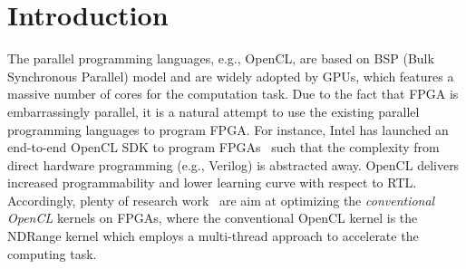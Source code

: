\section{Introduction}

The parallel programming languages, e.g., OpenCL, are based on BSP (Bulk Synchronous Parallel) model and are widely adopted by GPUs, which features a massive number of cores for the computation task. 
Due to the fact that FPGA is embarrassingly parallel, it is a natural attempt to use the existing parallel programming languages to program FPGA. For instance, Intel has launched an end-to-end OpenCL SDK to program FPGAs~\cite{altera_optimization} such that the complexity from direct hardware programming (e.g., Verilog) is abstracted away. OpenCL delivers increased programmability and lower learning curve with respect to RTL. Accordingly, plenty of research work~\cite{flexcl_tc18, opencl_compiler_ERSA12, fpga_opencl_model_hpca16, opencl_hpc_sc16, comba_iccad17, auto_code_generation_dac18} are aim at optimizing the \emph{conventional OpenCL} kernels on FPGAs, where the conventional OpenCL kernel is the NDRange kernel which employs a multi-thread approach to accelerate the computing task. 



